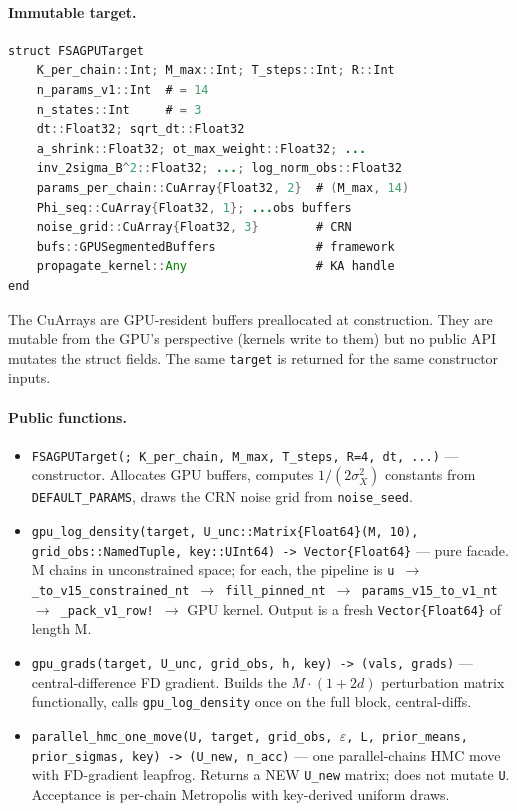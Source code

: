 \documentclass[11pt,a4paper]{article}
\begin{document}
\paragraph{Immutable target.}

\begin{lstlisting}[language=Java]
struct FSAGPUTarget
    K_per_chain::Int; M_max::Int; T_steps::Int; R::Int
    n_params_v1::Int  # = 14
    n_states::Int     # = 3
    dt::Float32; sqrt_dt::Float32
    a_shrink::Float32; ot_max_weight::Float32; ...
    inv_2sigma_B^2::Float32; ...; log_norm_obs::Float32
    params_per_chain::CuArray{Float32, 2}  # (M_max, 14)
    Phi_seq::CuArray{Float32, 1}; ...obs buffers
    noise_grid::CuArray{Float32, 3}        # CRN
    bufs::GPUSegmentedBuffers              # framework
    propagate_kernel::Any                  # KA handle
end
\end{lstlisting}

The CuArrays are GPU-resident buffers preallocated at construction.
They are mutable from the GPU's perspective (kernels write to them)
but no public API mutates the struct fields. The same \texttt{target}
is returned for the same constructor inputs.

\paragraph{Public functions.}

\begin{itemize}[itemsep=2pt,leftmargin=*]
\item \texttt{FSAGPUTarget(; K\_per\_chain, M\_max, T\_steps, R=4,
  dt, ...)} --- constructor. Allocates GPU buffers, computes
  $1/(2\sigma_X^2)$ constants from \texttt{DEFAULT\_PARAMS}, draws
  the CRN noise grid from \texttt{noise\_seed}.

\item \texttt{gpu\_log\_density(target, U\_unc::Matrix\{Float64\}(M,
  10), grid\_obs::NamedTuple, key::UInt64) -> Vector\{Float64\}}
  --- pure facade. M chains in unconstrained space; for each, the
  pipeline is \texttt{u $\to$ \_to\_v15\_constrained\_nt $\to$
  fill\_pinned\_nt $\to$ params\_v15\_to\_v1\_nt $\to$
  \_pack\_v1\_row! $\to$} GPU kernel. Output is a fresh
  \texttt{Vector\{Float64\}} of length M.

\item \texttt{gpu\_grads(target, U\_unc, grid\_obs, h, key) ->
  (vals, grads)} --- central-difference FD gradient. Builds the
  $M \cdot (1 + 2d)$ perturbation matrix functionally, calls
  \texttt{gpu\_log\_density} once on the full block, central-diffs.

\item \texttt{parallel\_hmc\_one\_move(U, target, grid\_obs, $\varepsilon$,
  L, prior\_means, prior\_sigmas, key) -> (U\_new, n\_acc)} --- one
  parallel-chains HMC move with FD-gradient leapfrog. Returns a NEW
  \texttt{U\_new} matrix; does not mutate \texttt{U}. Acceptance is
  per-chain Metropolis with key-derived uniform draws.
\end{itemize}
\end{document}
